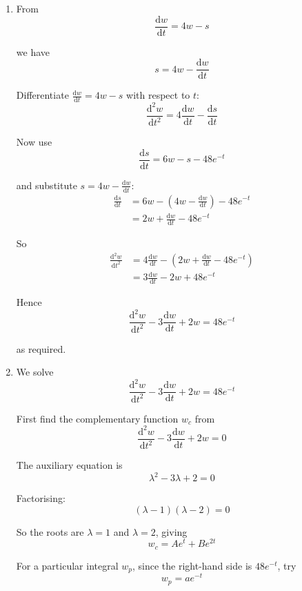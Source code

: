 \documentclass[leqno]{article}
\begin{document}
\begin{enumerate}[
  label=\textbf{\arabic*.},
  leftmargin=*,
  topsep=0pt,
  partopsep=0pt,
  parsep=0pt
]
\vspace*{10pt}

\begin{djsSolution}
\begin{enumerate}[label=\textbf{(\alph*)}]
  \item From
  \[
  \frac{\mathrm{d}w}{\mathrm{d}t}=4w-s
  \]

  we have
  \[
  s=4w-\frac{\mathrm{d}w}{\mathrm{d}t}
  \]

  Differentiate \(\frac{\mathrm{d}w}{\mathrm{d}t}=4w-s\) with respect to \(t\):
  \[
  \frac{\mathrm{d}^2w}{\mathrm{d}t^2}=4\frac{\mathrm{d}w}{\mathrm{d}t}-\frac{\mathrm{d}s}{\mathrm{d}t}
  \]

  Now use
  \[
  \frac{\mathrm{d}s}{\mathrm{d}t}=6w-s-48e^{-t}
  \]

  and substitute \(s=4w-\frac{\mathrm{d}w}{\mathrm{d}t}\):
  \begin{align*}
  \frac{\mathrm{d}s}{\mathrm{d}t}
  &=6w-\left(4w-\frac{\mathrm{d}w}{\mathrm{d}t}\right)-48e^{-t} \\
  &=2w+\frac{\mathrm{d}w}{\mathrm{d}t}-48e^{-t}
  \end{align*}

  So
  \begin{align*}
  \frac{\mathrm{d}^2w}{\mathrm{d}t^2}
  &=4\frac{\mathrm{d}w}{\mathrm{d}t}-\left(2w+\frac{\mathrm{d}w}{\mathrm{d}t}-48e^{-t}\right) \\
  &=3\frac{\mathrm{d}w}{\mathrm{d}t}-2w+48e^{-t}
  \end{align*}

  Hence
  \[
  \frac{\mathrm{d}^2w}{\mathrm{d}t^2}-3\frac{\mathrm{d}w}{\mathrm{d}t}+2w=48e^{-t}
  \]

  as required.

  \item We solve
  \[
  \frac{\mathrm{d}^2w}{\mathrm{d}t^2}-3\frac{\mathrm{d}w}{\mathrm{d}t}+2w=48e^{-t}
  \]

  First find the complementary function \(w_c\) from
  \[
  \frac{\mathrm{d}^2w}{\mathrm{d}t^2}-3\frac{\mathrm{d}w}{\mathrm{d}t}+2w=0
  \]

  The auxiliary equation is
  \[
  \lambda^2-3\lambda+2=0
  \]

  Factorising:
  \[
  (\lambda-1)(\lambda-2)=0
  \]

  So the roots are \(\lambda=1\) and \(\lambda=2\), giving
  \[
  w_c=Ae^t+Be^{2t}
  \]

  For a particular integral \(w_p\), since the right-hand side is \(48e^{-t}\), try
  \[
  w_p=ae^{-t}
  \]


\end{enumerate}
\end{djsSolution}
\end{enumerate}
\end{document}
